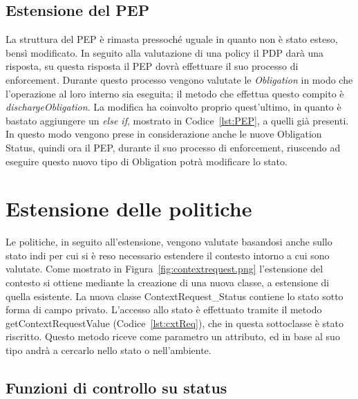 \subsection{Estensione del PEP}
\label{sub:estensione_PEP}
La struttura del \ac{PEP} è rimasta pressoché uguale in quanto non è stato esteso, bensì modificato.
In seguito alla valutazione di una policy il \ac{PDP} darà una risposta, su questa risposta il \ac{PEP} dovrà effettuare il suo processo di enforcement.
Durante questo processo vengono valutate le \textit{Obligation} in modo che l'operazione al loro interno sia eseguita; il metodo che effettua questo compito è 
\textit{dischargeObligation}. La modifica ha coinvolto proprio quest'ultimo, in quanto è bastato aggiungere un \textit{else if}, mostrato in Codice~\ref{lst:PEP}, a quelli già presenti.
In questo modo vengono prese in considerazione anche le nuove Obligation Status, quindi ora il \ac{PEP}, durante il suo processo di enforcement, riuscendo ad eseguire questo nuovo tipo di Obligation potrà modificare lo stato.


\section{Estensione delle politiche}
\label{sec:estensione_politiche}

Le politiche, in seguito all'estensione, vengono valutate basandosi anche sullo stato indi per cui si è reso necessario estendere il contesto intorno a cui sono valutate. Come mostrato in Figura~\ref{fig:contextrequest.png} l'estensione del contesto si ottiene mediante la creazione di una nuova classe, a estensione di quella esistente.
La nuova classe ContextRequest\_Status contiene lo stato sotto forma di campo privato. L'accesso allo stato è effettuato tramite il metodo getContextRequestValue (Codice~\ref{lst:cxtReq}), che in questa sottoclasse è stato riscritto.
Questo metodo riceve come parametro un attributo, ed in base al suo tipo andrà a cercarlo nello stato o nell'ambiente.

\subsection{Funzioni di controllo su status}
\label{sub:funzioni_controllo_status}

